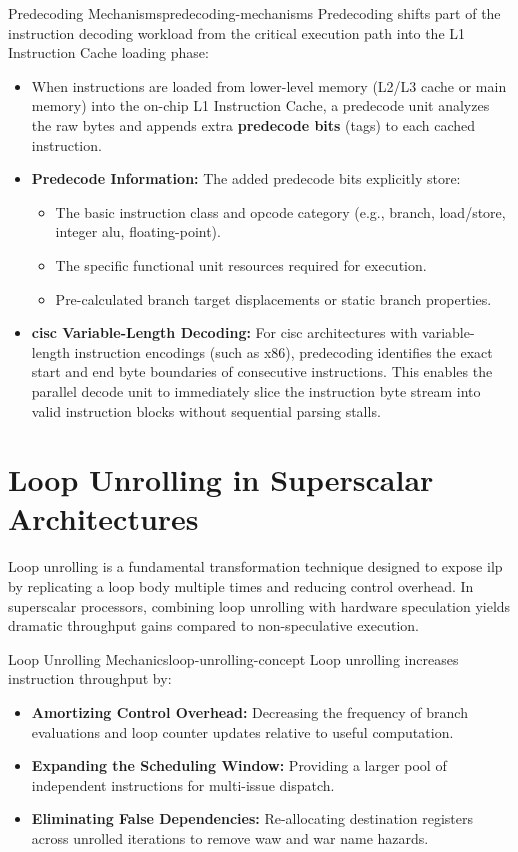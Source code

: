 \begin{observation}{Predecoding Mechanisms}{predecoding-mechanisms}
Predecoding shifts part of the instruction decoding workload from the critical execution path into the L1 Instruction Cache loading phase:
\begin{itemize}
    \item When instructions are loaded from lower-level memory (L2/L3 cache or main memory) into the on-chip L1 Instruction Cache, a predecode unit analyzes the raw bytes and appends extra \textbf{predecode bits} (tags) to each cached instruction.
    \item \textbf{Predecode Information:} The added predecode bits explicitly store:
    \begin{itemize}
        \item The basic instruction class and opcode category (e.g., branch, load/store, integer \gls{alu}, floating-point).
        \item The specific functional unit resources required for execution.
        \item Pre-calculated branch target displacements or static branch properties.
    \end{itemize}
    \item \textbf{\gls{cisc} Variable-Length Decoding:} For \gls{cisc} architectures with variable-length instruction encodings (such as x86), predecoding identifies the exact start and end byte boundaries of consecutive instructions. This enables the parallel decode unit to immediately slice the instruction byte stream into valid instruction blocks without sequential parsing stalls.
\end{itemize}
\end{observation}

\section{Loop Unrolling in Superscalar Architectures}
\label{sec:loop_unrolling_superscalar}

Loop unrolling is a fundamental transformation technique designed to expose \gls{ilp} by replicating a loop body multiple times and reducing control overhead. In superscalar processors, combining loop unrolling with hardware speculation yields dramatic throughput gains compared to non-speculative execution.

\begin{concept}{Loop Unrolling Mechanics}{loop-unrolling-concept}
Loop unrolling increases instruction throughput by:
\begin{itemize}
    \item \textbf{Amortizing Control Overhead:} Decreasing the frequency of branch evaluations and loop counter updates relative to useful computation.
    \item \textbf{Expanding the Scheduling Window:} Providing a larger pool of independent instructions for multi-issue dispatch.
    \item \textbf{Eliminating False Dependencies:} Re-allocating destination registers across unrolled iterations to remove \gls{waw} and \gls{war} name hazards.
\end{itemize}
\end{concept}

